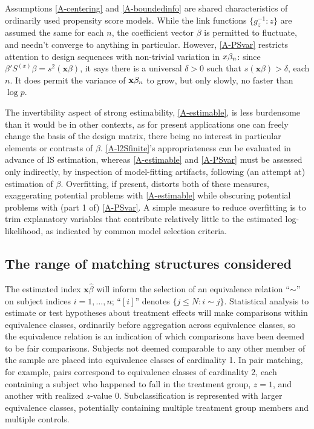 \documentclass{article}
\theoremstyle{remark}
\begin{document}
Assumptions \ref{A-centering} and \ref{A-boundedinfo} are shared characteristics of ordinarily used propensity score models.  While the link functions $\{g_{z}^{-1}: z\}$ are assumed the same for each $n$, the coefficient vector $\beta$ is permitted to fluctuate, and needn't converge to anything in particular.  However, \ref{A-PSvar} restricts attention to design sequences with non-trivial variation in ${x}\beta_{n } $: since $\beta'S^{(x)}\beta = s^{2}(\mathbf{x}\beta)$, it says there is a universal $\delta>0$ such that $s(\mathbf{x}\beta)>\delta$, each $n$.   It does permit the variance of $\mathbf{x}\beta_{n }$ to grow, but only slowly, no faster than $\log p$. 

The invertibility aspect of strong estimability, \ref{A-estimable}, is less burdensome than it would be in other contexts, as for present applications one can freely change the basis of the design matrix, there being no interest in particular elements or contrasts of $\beta$.   
\ref{A-l2Sfinite}'s appropriateness can be evaluated in advance of IS estimation, whereas \ref{A-estimable} and \ref{A-PSvar} must be assessed only indirectly, by inspection of model-fitting artifacts, following (an attempt at) estimation of $\beta$.
Overfitting, if present, distorts both of these measures, exaggerating potential problems with \ref{A-estimable} while obscuring potential problems with (part 1 of) \ref{A-PSvar}.  A simple measure to reduce overfitting is to trim explanatory variables that contribute relatively little to the estimated log-likelihood, as indicated by common model selection criteria.

\subsection{The range of matching structures considered}

The estimated index $\mathbf{x}\hat\beta$ will inform the selection of an equivalence relation ``$\sim$'' on subject indices $i = 1, \ldots, n$; ``$[i]$'' denotes $\{j\leq N: i \sim j\}$. Statistical analysis to estimate or test hypotheses about treatment effects will make comparisons within equivalence classes, ordinarily before aggregation across equivalence classes, so the equivalence relation is an indication of which comparisons have been deemed to be fair comparisons.  Subjects not deemed comparable to any other member of the sample are placed into equivalence classes of cardinality 1.  In pair matching, for example, pairs correspond to equivalence classes of cardinality 2, each containing a subject who happened to fall in the treatment group, $z=1$, and another with realized  $z$-value 0. Subclassification is represented with larger equivalence classes, potentially containing multiple treatment group members and multiple controls. 
\end{document}
